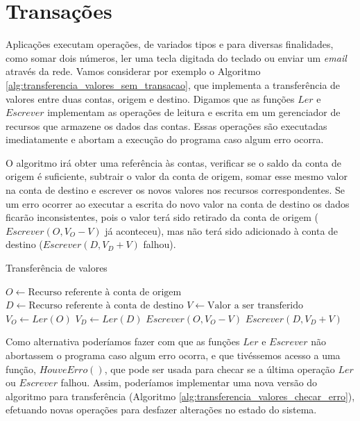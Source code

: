 \documentclass[11pt,twoside,a4paper]{book}
\begin{document}
\section{Transações}
\label{sec:transacoes}
Aplicações executam operações, de variados tipos e para diversas finalidades, como somar dois números, ler uma tecla digitada do teclado ou enviar um \emph{email} através da rede. Vamos considerar por exemplo o Algoritmo \ref{alg:transferencia_valores_sem_transacao}, que implementa a transferência de valores entre duas contas, origem e destino. Digamos que as funções $Ler$ e $Escrever$ implementam as operações de leitura e escrita em um gerenciador de recursos que armazene os dados das contas. Essas operações são executadas imediatamente e abortam a execução do programa caso algum erro ocorra.

O algoritmo irá obter uma referência às contas, verificar se o saldo da conta de origem é suficiente, subtrair o valor da conta de origem, somar esse mesmo valor na conta de destino e escrever os novos valores nos recursos correspondentes. Se um erro ocorrer ao executar a escrita do novo valor na conta de destino os dados ficarão inconsistentes, pois o valor terá sido retirado da conta de origem ($Escrever(O, V_O - V)$ já aconteceu), mas não terá sido adicionado à conta de destino ($Escrever(D, V_D + V)$ falhou).

\begin{algorithm}
\caption{Transferência de valores}
\label{alg:transferencia_valores_sem_transacao}
\begin{algorithmic}[1]
\State $O \gets \text{Recurso referente à conta de origem}$
\State $D \gets \text{Recurso referente à conta de destino}$
\State $V \gets \text{Valor a ser transferido}$
\State $V_O \gets Ler(O)$
    \State $V_D \gets Ler(D)$
    \State $Escrever(O, V_O - V)$
    \State $Escrever(D, V_D + V)$
\EndIf
\end{algorithmic}
\end{algorithm}

Como alternativa poderíamos fazer com que as funções $Ler$ e $Escrever$ não abortassem o programa caso algum erro ocorra, e que tivéssemos acesso a uma função, $HouveErro()$, que pode ser usada para checar se a última operação $Ler$ ou $Escrever$ falhou. Assim, poderíamos implementar uma nova versão do algoritmo para transferência (Algoritmo \ref{alg:transferencia_valores_checar_erro}), efetuando novas operações para desfazer alterações no estado do sistema.
\end{document}
